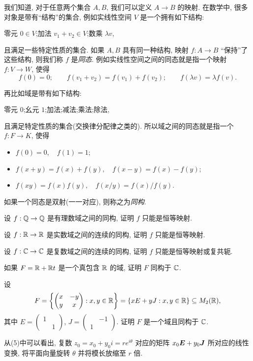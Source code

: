 \sectionExtraReading

\begin{homework}
  \item 我们知道, 对于任意两个集合 $A,B$, 我们可以定义 $A\to B$ 的映射.
  在数学中, 很多对象是带有``结构''的集合, 例如实线性空间 $V$ 是一个拥有如下结构:
  \begin{center}
    零元 $0\in V$;\qquad 加法 $v_1+v_2\in V$;\qquad 数乘 $\lambda v$,
  \end{center}
  且满足一些特定性质的集合.
  如果 $A,B$ 具有同一种结构, 映射 $f:A\to B$ ``保持''了这些结构, 则我们称 $f$ 是\emph{同态}.	
  例如实线性空间之间的同态就是指一个映射 $f:V\to W$, 使得
  \[f(0)=0;\qquad f(v_1+v_2)=f(v_1)+f(v_2);\qquad f(\lambda v)=\lambda f(v).\]

  再比如域是带有如下结构:
  \begin{center}
    零元 $0$;\qquad 幺元 $1$;\qquad 加法;\qquad 减法;\qquad 乘法;\qquad 除法, 
  \end{center}
  且满足特定性质的集合(交换律分配律之类的). 所以域之间的同态就是指一个 $f:F\to K$, 使得
  \begin{itemize}
    \item $f(0)=0,\quad f(1)=1$;
    \item $f(x+y)=f(x)+f(y),\quad f(x-y)=f(x)-f(y)$;
    \item $f(xy)=f(x)f(y),\quad f(x/y)=f(x)/f(y)$.
  \end{itemize}
  如果一个同态是双射(一一对应), 则称之为\emph{同构}.

  \begin{exlist}
    \item 设 $f:{\mathbb{Q}}\to{\mathbb{Q}}$ 是有理数域之间的同构, 证明 $f$ 只能是恒等映射.
    \item 设 $f:{\mathbb{R}}\to{\mathbb{R}}$ 是实数域之间的连续的同构, 证明 $f$ 只能是恒等映射.
    \item 设 $f:{\mathbb{C}}\to{\mathbb{C}}$ 是复数域之间的连续的同构, 证明 $f$ 只能是恒等映射或复共轭.
    \item 如果 $F={\mathbb{R}}+{\mathbb{R}} t$ 是一个真包含 ${\mathbb{R}}$ 的域, 证明 $F$ 同构于 ${\mathbb{C}}$.
    \item 设
    \[F={\left\{\begin{pmatrix}
      x&-y\\y&x\end{pmatrix}: x,y\in{\mathbb{R}}\right\}}
      ={\left\{xE+yJ: x,y\in{\mathbb{R}}\right\}}\subseteq M_2({\mathbb{R}}),\]
    其中 $E=\begin{pmatrix}1& \\&1\end{pmatrix}$,
    $J=\begin{pmatrix}&-1\\1&\end{pmatrix}$.
    证明 $F$ 是一个域且同构于 ${\mathbb{C}}$.
    \item 从(5)中可以看出, 复数 $z_0=x_0+y_0i=re^{i\theta}$ 对应的矩阵 $x_0{\boldsymbol{E}}+y_0{\boldsymbol{J}}$ 所对应的线性变换, 将平面向量旋转 $\theta$ 并将模长放缩至 $r$ 倍.
    \end{exlist}
    

\end{homework}
